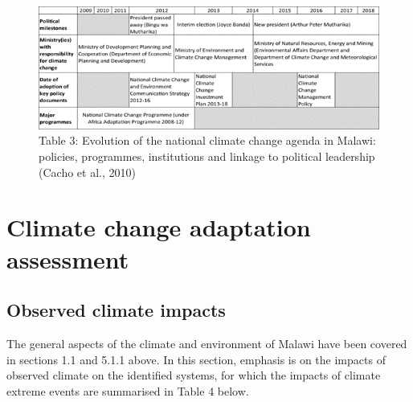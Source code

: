 \documentclass[
]{book}
\begin{document}
\begin{figure}
\centering
\includegraphics{images/cc_policies_evolution.png}
\caption{Table 3: Evolution of the national climate change agenda in Malawi: policies, programmes, institutions and linkage to political leadership (Cacho et al., 2010)}
\end{figure}

\hypertarget{climate-change-adaptation-assessment}{%
\chapter{Climate change adaptation assessment}\label{climate-change-adaptation-assessment}}

\hypertarget{observed-climate-impacts}{%
\section{Observed climate impacts}\label{observed-climate-impacts}}

The general aspects of the climate and environment of Malawi have been covered in sections 1.1 and 5.1.1
above. In this section, emphasis is on the impacts of observed climate on the identified systems, for which the impacts of climate extreme events are summarised in Table 4 below.

\providecommand{\docline}[3]{\noalign{\global\setlength{\arrayrulewidth}{#1}}\arrayrulecolor[HTML]{#2}\cline{#3}}

\setlength{\tabcolsep}{2pt}

\renewcommand*{\arraystretch}{1.5}
\end{document}
